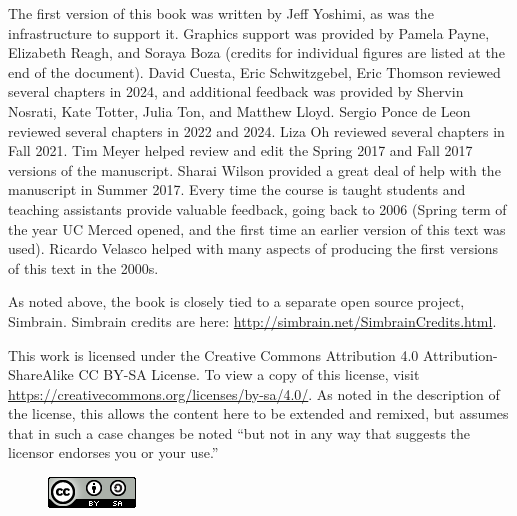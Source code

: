 The first version of this book was written by Jeff Yoshimi, as was the infrastructure to support it. Graphics support was provided by Pamela Payne, Elizabeth Reagh, and Soraya Boza (credits for individual figures are listed at the end of the document). David Cuesta, Eric Schwitzgebel, Eric Thomson reviewed several chapters in 2024, and additional feedback was provided by Shervin Nosrati, Kate Totter, Julia Ton, and Matthew Lloyd. Sergio Ponce de Leon reviewed several chapters in 2022 and 2024. Liza Oh reviewed several chapters in Fall 2021. Tim Meyer helped review and edit the Spring 2017 and Fall 2017 versions of the manuscript.  Sharai Wilson provided a great deal of help with the manuscript in Summer 2017. Every time the course is taught students and teaching assistants provide valuable feedback, going back to 2006 (Spring term of the year UC Merced opened, and the first time an earlier version of this text was used). Ricardo Velasco helped with many aspects of producing the first versions of this text in the 2000s.

As noted above, the book is closely tied to a separate open source project, Simbrain. Simbrain credits are here: \url{http://simbrain.net/SimbrainCredits.html}. 

This work is licensed under the Creative Commons Attribution 4.0 Attribution-ShareAlike 
CC BY-SA  License. To view a copy of this license, visit \url{https://creativecommons.org/licenses/by-sa/4.0/}. As noted in the description of the license, this allows the content here to be extended and remixed, but assumes that in such a case changes be noted ``but not in any way that suggests the licensor endorses you or your use.''  

\begin{figure}[h]
\includegraphics[scale=.7]{./images/CC_License.png}
\end{figure}
